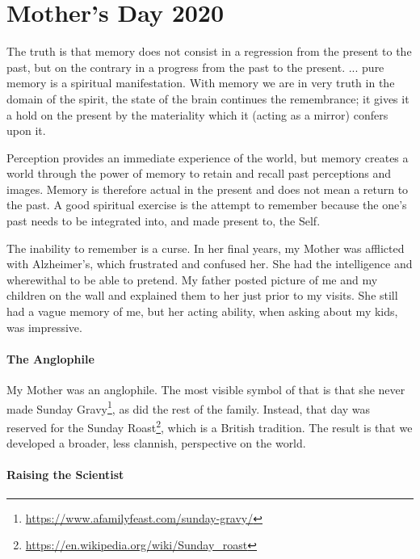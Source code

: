 \section{Mother’s Day 2020}

\begin{quotex}
The truth is that memory does not consist in a regression from the present to the past, but on the contrary in a progress from the past to the present. ... pure memory is a spiritual manifestation. With memory we are in very truth in the domain of the spirit, the state of the brain continues the remembrance; it gives it a hold on the present by the materiality which it (acting as a mirror) confers upon it.
\end{quotex}


Perception provides an immediate experience of the world, but memory creates a world through the power of memory to retain and recall past perceptions and images. Memory is therefore actual in the present and does not mean a return to the past. A good spiritual exercise is the attempt to remember because the one's past needs to be integrated into, and made present to, the Self.

The inability to remember is a curse. In her final years, my Mother was afflicted with Alzheimer's, which frustrated and confused her. She had the intelligence and wherewithal to be able to pretend. My father posted picture of me and my children on the wall and explained them to her just prior to my visits. She still had a vague memory of me, but her acting ability, when asking about my kids, was impressive.

\paragraph{The Anglophile}


My Mother was an anglophile. The most visible symbol of that is that she never made Sunday Gravy\footnote{\url{https://www.afamilyfeast.com/sunday-gravy/}}, as did the rest of the family. Instead, that day was reserved for the Sunday Roast\footnote{\url{https://en.wikipedia.org/wiki/Sunday_roast}}, which is a British tradition. The result is that we developed a broader, less clannish, perspective on the world.

\paragraph{Raising the Scientist}


